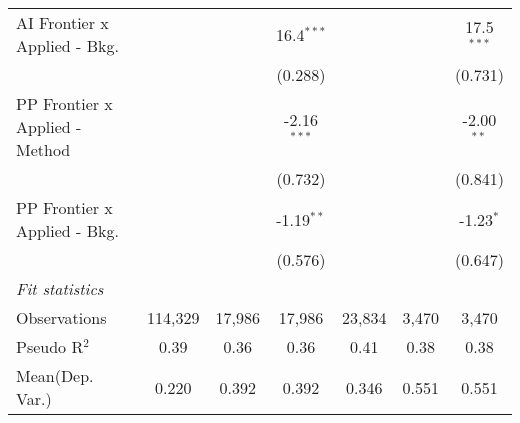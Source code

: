 \begin{tabular}{lcccccc}
   AI Frontier x Applied - Bkg.   &                &               & 16.4$^{***}$  &                &               & 17.5$^{***}$\\   
                                  &                &               & (0.288)       &                &               & (0.731)\\   
   PP Frontier x Applied - Method &                &               & -2.16$^{***}$ &                &               & -2.00$^{**}$\\   
                                  &                &               & (0.732)       &                &               & (0.841)\\   
   PP Frontier x Applied - Bkg.   &                &               & -1.19$^{**}$  &                &               & -1.23$^{*}$\\   
                                  &                &               & (0.576)       &                &               & (0.647)\\   
   \midrule
   \emph{Fit statistics}\\
   Observations                   & 114,329        & 17,986        & 17,986        & 23,834         & 3,470         & 3,470\\  
   Pseudo R$^2$                   & 0.39           & 0.36          & 0.36          & 0.41           & 0.38          & 0.38\\  
Mean(Dep. Var.) & 0.220 & 0.392 & 0.392 & 0.346 & 0.551 & 0.551 \\
   

\end{tabular}

